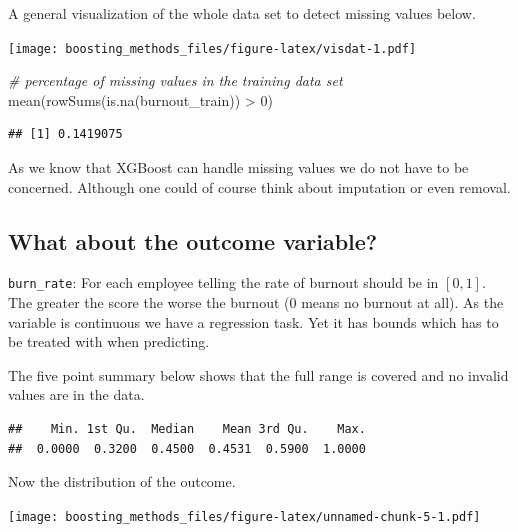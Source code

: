 \documentclass[
]{book}
\newenvironment{Shaded}{\begin{snugshade}}{\end{snugshade}}
\newcommand{\CommentTok}[1]{\textcolor[rgb]{0.56,0.35,0.01}{\textit{#1}}}
\newcommand{\DecValTok}[1]{\textcolor[rgb]{0.00,0.00,0.81}{#1}}
\newcommand{\FunctionTok}[1]{\textcolor[rgb]{0.00,0.00,0.00}{#1}}
\newcommand{\NormalTok}[1]{#1}
\newcommand{\SpecialCharTok}[1]{\textcolor[rgb]{0.00,0.00,0.00}{#1}}
\begin{document}
A general visualization of the whole data set to detect missing values below.

\texttt{[image: boosting\_methods\_files/figure-latex/visdat-1.pdf]}

\begin{Shaded}
\begin{Highlighting}[]
\CommentTok{\# percentage of missing values in the training data set}
\FunctionTok{mean}\NormalTok{(}\FunctionTok{rowSums}\NormalTok{(}\FunctionTok{is.na}\NormalTok{(burnout\_train)) }\SpecialCharTok{\textgreater{}} \DecValTok{0}\NormalTok{)}
\end{Highlighting}
\end{Shaded}

\begin{verbatim}
## [1] 0.1419075
\end{verbatim}

As we know that XGBoost can handle missing values we do not have to be concerned. Although one could of course think about imputation or even removal.

\hypertarget{what-about-the-outcome-variable}{%
\subsection{What about the outcome variable?}\label{what-about-the-outcome-variable}}

\texttt{burn\_rate}: For each employee telling the rate of burnout should be in \([0,1]\). The greater the score the worse the burnout (0 means no burnout at all). As the variable is continuous we have a regression task. Yet it has bounds which has to be treated with when predicting.

The five point summary below shows that the full range is covered and no invalid values are in the data.

\begin{verbatim}
##    Min. 1st Qu.  Median    Mean 3rd Qu.    Max. 
##  0.0000  0.3200  0.4500  0.4531  0.5900  1.0000
\end{verbatim}

Now the distribution of the outcome.

\texttt{[image: boosting\_methods\_files/figure-latex/unnamed-chunk-5-1.pdf]}
\end{document}
